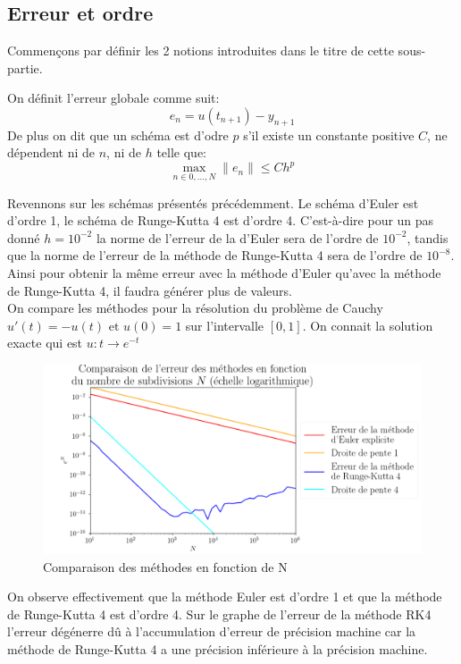\documentclass{article}
\newtheorem[M , nocut]{prop}{Proposition}[section]
\newtheorem[M , nocut]{definition}{Définition}
\newtheorem[M , nocut]{lemme}{Lemme}
\newtheorem[L , nocut]{thm}{Théoreme}
\newtheorem[M , nocut]{cor}{Corollaire}
\begin{document}
\subsection*{Erreur et ordre}

Commençons par définir les 2 notions introduites dans le titre de cette sous-partie.
\begin{definition}
    On définit l'erreur globale comme suit:
    $$ e_n = u(t_{n+1}) - y_{n+1} $$
    De plus on dit que un schéma est d'odre $p$ s'il existe un constante positive $C$, ne dépendent ni de $n$, ni de $h$ telle que:
    $$ \max_{n\in 0,\dots,N} \|e_n\| \le C h^p$$
\end{definition}
Revennons sur les schémas présentés précédemment. Le schéma d'Euler est d'ordre 1, le schéma de Runge-Kutta 4 est d'ordre 4. C'est-\`a-dire pour un pas donné $h=10^{-2}$ la norme de l'erreur de la d'Euler sera de l'ordre de $10^{-2}$, tandis que la norme de l'erreur de la méthode de Runge-Kutta 4 sera de l'ordre de $10^{-8}$. Ainsi pour obtenir la même erreur avec la méthode d'Euler qu'avec la méthode de Runge-Kutta 4, il faudra générer plus de valeurs.\\
On compare les méthodes pour la résolution du problème de Cauchy $u'(t) = - u(t) \text{ et }u(0)=1$ sur l'intervalle $[0,1]$. On connait la solution exacte qui est $u : t \to e^{-t}$
\begin{figure}[!ht]
    \begin{center}
        \includegraphics[width=\textwidth]{methodsError.png}
        \caption{Comparaison des méthodes en fonction de N}
    \end{center}
\end{figure}
On observe effectivement que la méthode Euler est d'ordre 1 et que la méthode de Runge-Kutta 4 est d'ordre 4. Sur le graphe de l'erreur de la méthode RK4 l'erreur dégénerre dû à l'accumulation d'erreur de précision machine car la méthode de Runge-Kutta 4 a une précision inférieure à la précision machine.
\end{document}
